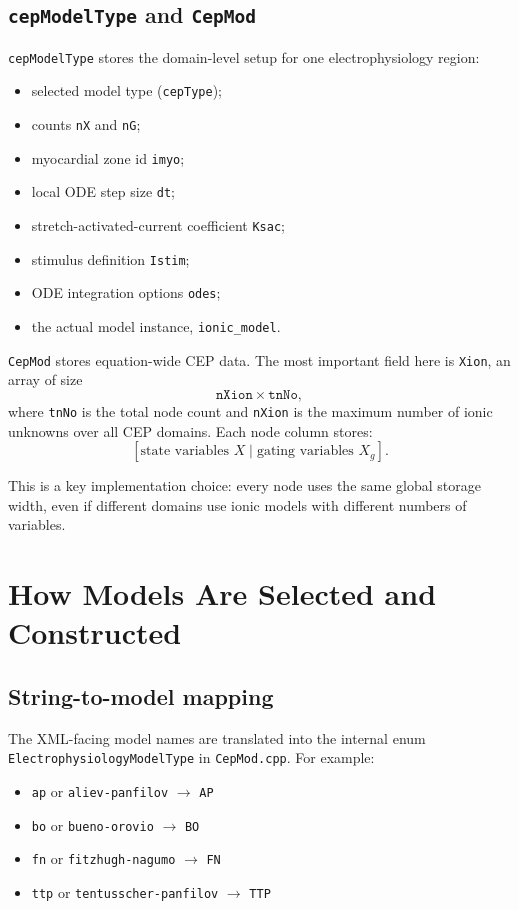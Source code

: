 \documentclass[11pt]{article}
\begin{document}
\subsection{\texttt{cepModelType} and \texttt{CepMod}}

\texttt{cepModelType} stores the domain-level setup for one electrophysiology region:
\begin{itemize}[leftmargin=*]
\item selected model type (\texttt{cepType});
\item counts \texttt{nX} and \texttt{nG};
\item myocardial zone id \texttt{imyo};
\item local ODE step size \texttt{dt};
\item stretch-activated-current coefficient \texttt{Ksac};
\item stimulus definition \texttt{Istim};
\item ODE integration options \texttt{odes};
\item the actual model instance, \texttt{ionic\_model}.
\end{itemize}

\texttt{CepMod} stores equation-wide CEP data. The most important field here is
\texttt{Xion}, an array of size
\[
\texttt{nXion} \times \texttt{tnNo},
\]
where \texttt{tnNo} is the total node count and \texttt{nXion} is the maximum number of ionic unknowns over all CEP domains. Each node column stores:
\[
[\text{state variables } X \; | \; \text{gating variables } X_g].
\]

This is a key implementation choice: every node uses the same global storage width, even if different domains use ionic models with different numbers of variables.

\section{How Models Are Selected and Constructed}

\subsection{String-to-model mapping}

The XML-facing model names are translated into the internal enum
\texttt{ElectrophysiologyModelType} in \texttt{CepMod.cpp}. For example:
\begin{itemize}[leftmargin=*]
\item \texttt{ap} or \texttt{aliev-panfilov} $\rightarrow$ \texttt{AP}
\item \texttt{bo} or \texttt{bueno-orovio} $\rightarrow$ \texttt{BO}
\item \texttt{fn} or \texttt{fitzhugh-nagumo} $\rightarrow$ \texttt{FN}
\item \texttt{ttp} or \texttt{tentusscher-panfilov} $\rightarrow$ \texttt{TTP}
\end{itemize}
\end{document}
